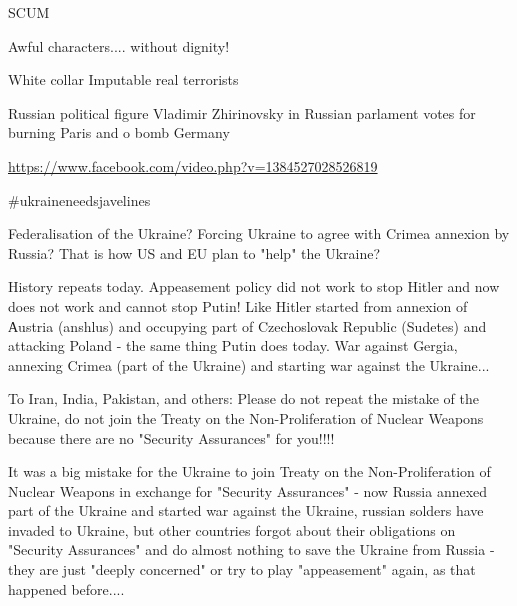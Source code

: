  
 
 
 
 

SCUM


Awful characters.... without dignity!


White collar Imputable real terrorists


Russian political figure Vladimir Zhirinovsky in Russian parlament votes for
burning Paris and o bomb Germany 

\url{https://www.facebook.com/video.php?v=1384527028526819}

\#ukraineneedsjavelines

Federalisation of the Ukraine? Forcing Ukraine to agree with Crimea annexion by
Russia? That is how US and EU plan to "help" the Ukraine?

History repeats today. Appeasement policy did not work to stop Hitler and now
does not work and cannot stop Putin! Like Hitler started from annexion of
Аustria (anshlus) and occupying part of Czechoslovak Republic (Sudetes) and
attacking Poland - the same thing Putin does today. War against Gergia,
annexing Crimea (part of the Ukraine) and starting war against the Ukraine...

To Iran, India, Pakіstan, and others: Please do not repeat the mistake of the
Ukraine, do not join the Treaty on the Non-Proliferation of Nuclear Weapons
because there are no "Security Assurances" for you!!!!

It was a big mistake for the Ukraine to join Treaty on the Non-Proliferation of
Nuclear Weapons in exchange for "Security Assurances" - now Russia annexed part
of the Ukraine and started war against the Ukraine, russian solders have
invaded to Ukraine, but other countries forgot about their obligations on
"Security Assurances" and do almost nothing to save the Ukraine from Russia -
they are just "deeply concerned" or try to play "appeasement" again, as that
happened before....

